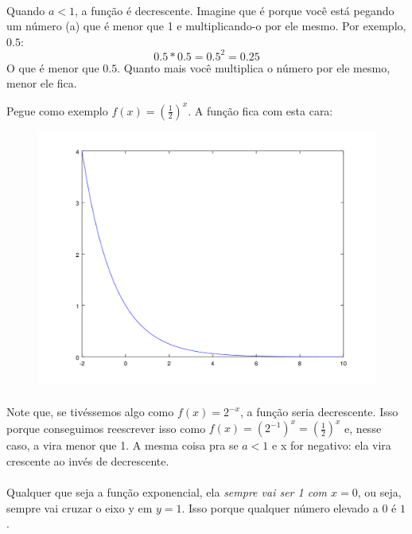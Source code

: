 \documentclass[11pt]{article}
\begin{document}
\paragraph{}
Quando $a < 1$, a função é decrescente. Imagine que é porque você está pegando
um número (a) que é menor que 1 e multiplicando-o por ele mesmo. Por exemplo,
$0.5$: 
$$0.5*0.5 = 0.5^2 = 0.25$$ 
O que é menor que $0.5$. Quanto mais você
multiplica o número por ele mesmo, menor ele fica.
\par
Pegue como exemplo $f(x) = {(\frac{1}{2})}^x$. A função fica com esta cara:
\begin{figure}[H]
	\centering
	\includegraphics[width=0.7\linewidth]{imgs/exp_inv.png}
\end{figure}
\paragraph{}
Note que, se tivéssemos algo como $f(x) = 2^{-x}$, a função seria decrescente.
Isso porque conseguimos reescrever isso como $f(x) = {(2^{-1})}^x = 
{(\frac{1}{2})}^x$ e, nesse caso, a vira menor que 1. 
A mesma coisa pra se $a < 1$ e x for negativo: ela vira crescente ao invés de
decrescente.
\paragraph{}
Qualquer que seja a função exponencial, ela \emph{sempre vai ser 1 com $x=0$},
ou seja, sempre vai cruzar o eixo y em $y=1$. Isso porque qualquer número
elevado a $0$ é $1$.

\newpage{}
\end{document}
